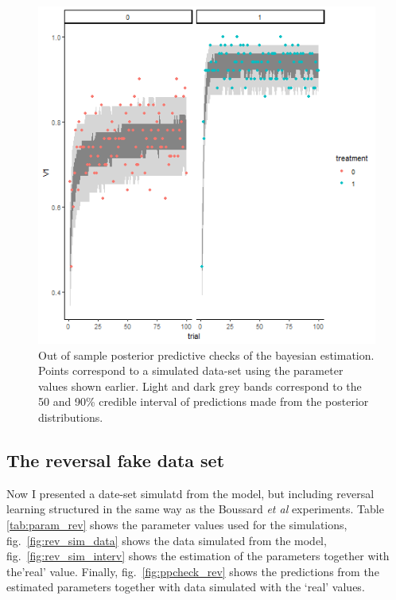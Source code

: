 \documentclass[
]{article}
\begin{document}
\begin{figure}

\includegraphics[width=6.67in,]{images/simple_ppchecks} \hfill{}

\caption{Out of sample posterior predictive checks of the bayesian estimation. Points correspond to a simulated data-set using the parameter values shown earlier. Light and dark grey bands correspond to the 50 and 90\% credible interval of predictions made from the posterior distributions.}\label{fig:ppcheck_simple}
\end{figure}

\hypertarget{the-reversal-fake-data-set}{%
\subsection{The reversal fake data
set}\label{the-reversal-fake-data-set}}

Now I presented a date-set simulatd from the model, but including
reversal learning structured in the same way as the Boussard \emph{et
al} experiments. Table \ref{tab:param_rev} shows the parameter values
used for the simulations, fig.~\ref{fig:rev_sim_data} shows the data
simulated from the model, fig.~\ref{fig:rev_sim_interv} shows the
estimation of the parameters together with the'real' value. Finally,
fig.~\ref{fig:ppcheck_rev} shows the predictions from the estimated
parameters together with data simulated with the `real' values.
\end{document}
